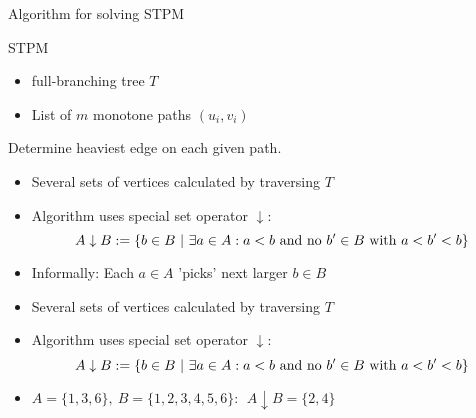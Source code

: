 \documentclass[18pt]{beamer}
\begin{document}
\begin{frame}{Algorithm for solving STPM}

	\begin{block}{STPM}
	 \begin{itemize}
	 	\item full-branching tree $T$
	 	\item List of $m$ monotone paths $(u_i,v_i)$
	 \end{itemize}
 	Determine heaviest edge on each given path.
	\end{block}
	\bigskip
	\pause
	\begin{overprint}
	\begin{itemize}
	\item  Several sets of vertices calculated by traversing $T$
	\item  Algorithm uses special {\color{blue}set operator} $\downarrow$:
	\[
		A \downarrow B := \{ b \in B \ | \ \exists a \in A: a < b \textup{ and no } b'\in B \textup{ with } a < b' < b \} 
	\]
	\item Informally: Each $a \in A$ 'picks' next larger $b \in B$ 
	\end{itemize}
	\begin{itemize}
		\item  Several sets of vertices calculated by traversing $T$
		\item  Algorithm uses special {\color{blue}set operator} $\downarrow$:
		\[
		A \downarrow B := \{ b \in B \ | \ \exists a \in A: a < b \textup{ and no } b'\in B \textup{ with } a < b' < b \} 
		\]
		\item $A = \{1,3,6\}, \ B = \{1,2,3,4,5,6\}: \ \ A \downarrow B = \{2,4\}$ 
	\end{itemize}
	\end{overprint}
\end{frame}
\end{document}
